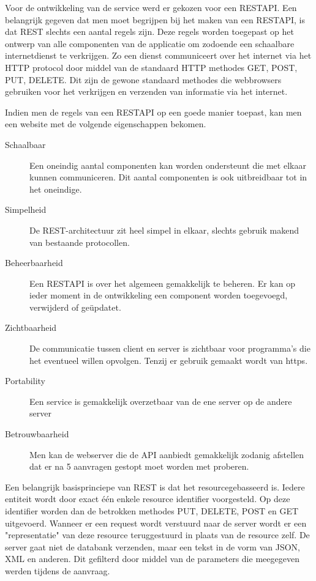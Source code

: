 \documentclass[a4paper,11pt]{article}
\begin{document}
Voor de ontwikkeling van de service werd er gekozen voor een RESTAPI. Een belangrijk gegeven dat men moet begrijpen bij het maken van een RESTAPI, is dat REST slechts een aantal regels zijn. Deze regels worden toegepast op het ontwerp van alle componenten van de applicatie om zodoende een schaalbare internetdienst te verkrijgen. Zo een dienst communiceert over het internet via het HTTP protocol door middel van de standaard HTTP methodes GET, POST, PUT, DELETE. Dit zijn de gewone standaard methodes die webbrowsers gebruiken voor het verkrijgen en verzenden van informatie via het internet. \cite{wiki:restapi}

Indien men de regels van een RESTAPI op een goede manier toepast, kan men een website met de volgende eigenschappen bekomen.

\begin{description}
\item[Schaalbaar] Een oneindig aantal componenten kan worden ondersteunt die met elkaar kunnen communiceren. Dit aantal componenten is ook uitbreidbaar tot in het oneindige.
\item[Simpelheid] De REST-architectuur zit heel simpel in elkaar, slechts gebruik makend van bestaande protocollen.
\item[Beheerbaarheid] Een RESTAPI is over het algemeen gemakkelijk te beheren. Er kan op ieder moment in de ontwikkeling een component worden toegevoegd, verwijderd of geüpdatet.
\item[Zichtbaarheid] De communicatie tussen client en server is zichtbaar voor programma's die het eventueel willen opvolgen. Tenzij er gebruik gemaakt wordt van https.
\item[Portability] Een service is gemakkelijk overzetbaar van de ene server op de andere server
\item[Betrouwbaarheid] Men kan de webserver die de API aanbiedt gemakkelijk zodanig afstellen dat er na 5 aanvragen gestopt moet worden met proberen. 
\end{description}

Een belangrijk basisprinciepe van REST is dat het resourcegebasseerd is. Iedere entiteit wordt door exact één enkele resource identifier voorgesteld. Op deze identifier worden dan de betrokken methodes PUT, DELETE, POST en GET uitgevoerd. Wanneer er een request wordt verstuurd naar de server wordt er een "representatie" van deze resource teruggestuurd in plaats van de resource zelf. De server gaat niet de databank verzenden, maar een tekst in de vorm van JSON, XML en anderen. Dit gefilterd door middel van de parameters die meegegeven werden tijdens de aanvraag.
\end{document}
